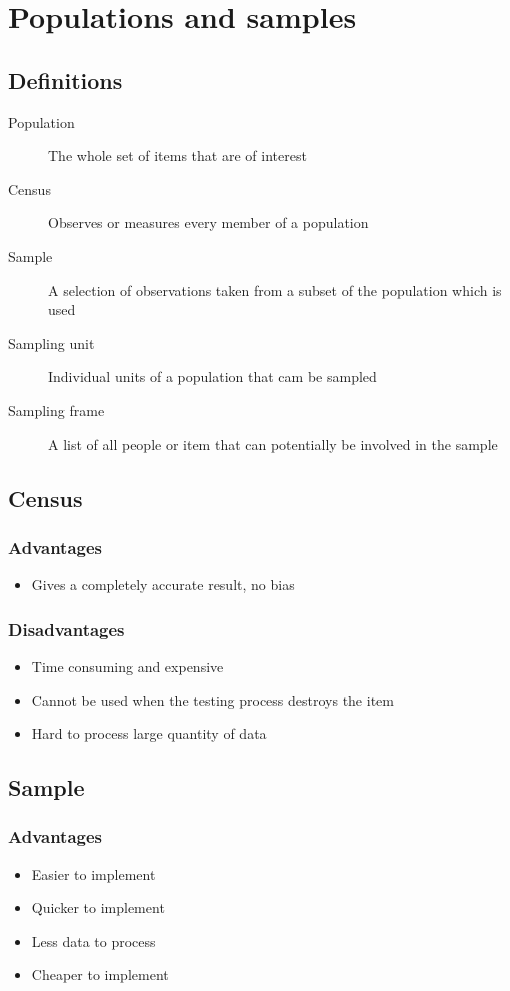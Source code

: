 \section{Populations and samples}
\subsection{Definitions}
\begin{description}
    \item[Population] The whole set of items that are of interest
    \item[Census] Observes or measures every member of a population
    \item[Sample] A selection of observations taken from a subset of the population which is used
    \item[Sampling unit] Individual units of a population that cam be sampled
    \item[Sampling frame] A list of all people or item that can potentially be involved in the sample
\end{description}

\subsection{Census}
\subsubsection{Advantages}
\begin{itemize}
    \item Gives a completely accurate result, no bias
\end{itemize}
\subsubsection{Disadvantages}
\begin{itemize}
    \item Time consuming and expensive
    \item Cannot be used when the testing process destroys the item
    \item Hard to process large quantity of data
\end{itemize}
\subsection{Sample}
\subsubsection{Advantages}
\begin{itemize}
    \item Easier to implement
    \item Quicker to implement
    \item Less data to process
    \item Cheaper to implement
\end{itemize}
